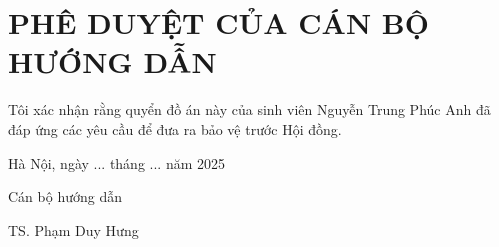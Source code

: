 \chapter*{PHÊ DUYỆT CỦA CÁN BỘ HƯỚNG DẪN}
\fontsize{13}{15}\selectfont

Tôi xác nhận rằng quyển đồ án này của sinh viên Nguyễn Trung Phúc Anh đã đáp ứng các yêu cầu để đưa ra bảo vệ trước Hội đồng.

\vspace{1cm}

\begin{flushright}
    Hà Nội, ngày ... tháng ... năm 2025 \par
    Cán bộ hướng dẫn\hspace*{1.4cm}\par
    \vspace{2.5cm}
    TS. Phạm Duy Hưng\hspace*{1cm}
\end{flushright}